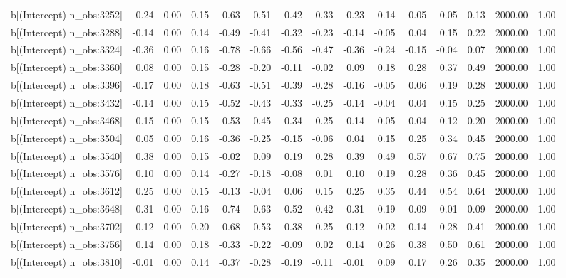 \begin{table}[ht]
\begin{tabular}{rrrrrrrrrrrrrrr}
  b[(Intercept) n\_obs:3252] & -0.24 & 0.00 & 0.15 & -0.63 & -0.51 & -0.42 & -0.33 & -0.23 & -0.14 & -0.05 & 0.05 & 0.13 & 2000.00 & 1.00 \\ 
  b[(Intercept) n\_obs:3288] & -0.14 & 0.00 & 0.14 & -0.49 & -0.41 & -0.32 & -0.23 & -0.14 & -0.05 & 0.04 & 0.15 & 0.22 & 2000.00 & 1.00 \\ 
  b[(Intercept) n\_obs:3324] & -0.36 & 0.00 & 0.16 & -0.78 & -0.66 & -0.56 & -0.47 & -0.36 & -0.24 & -0.15 & -0.04 & 0.07 & 2000.00 & 1.00 \\ 
  b[(Intercept) n\_obs:3360] & 0.08 & 0.00 & 0.15 & -0.28 & -0.20 & -0.11 & -0.02 & 0.09 & 0.18 & 0.28 & 0.37 & 0.49 & 2000.00 & 1.00 \\ 
  b[(Intercept) n\_obs:3396] & -0.17 & 0.00 & 0.18 & -0.63 & -0.51 & -0.39 & -0.28 & -0.16 & -0.05 & 0.06 & 0.19 & 0.28 & 2000.00 & 1.00 \\ 
  b[(Intercept) n\_obs:3432] & -0.14 & 0.00 & 0.15 & -0.52 & -0.43 & -0.33 & -0.25 & -0.14 & -0.04 & 0.04 & 0.15 & 0.25 & 2000.00 & 1.00 \\ 
  b[(Intercept) n\_obs:3468] & -0.15 & 0.00 & 0.15 & -0.53 & -0.45 & -0.34 & -0.25 & -0.14 & -0.05 & 0.04 & 0.12 & 0.20 & 2000.00 & 1.00 \\ 
  b[(Intercept) n\_obs:3504] & 0.05 & 0.00 & 0.16 & -0.36 & -0.25 & -0.15 & -0.06 & 0.04 & 0.15 & 0.25 & 0.34 & 0.45 & 2000.00 & 1.00 \\ 
  b[(Intercept) n\_obs:3540] & 0.38 & 0.00 & 0.15 & -0.02 & 0.09 & 0.19 & 0.28 & 0.39 & 0.49 & 0.57 & 0.67 & 0.75 & 2000.00 & 1.00 \\ 
  b[(Intercept) n\_obs:3576] & 0.10 & 0.00 & 0.14 & -0.27 & -0.18 & -0.08 & 0.01 & 0.10 & 0.19 & 0.28 & 0.36 & 0.45 & 2000.00 & 1.00 \\ 
  b[(Intercept) n\_obs:3612] & 0.25 & 0.00 & 0.15 & -0.13 & -0.04 & 0.06 & 0.15 & 0.25 & 0.35 & 0.44 & 0.54 & 0.64 & 2000.00 & 1.00 \\ 
  b[(Intercept) n\_obs:3648] & -0.31 & 0.00 & 0.16 & -0.74 & -0.63 & -0.52 & -0.42 & -0.31 & -0.19 & -0.09 & 0.01 & 0.09 & 2000.00 & 1.00 \\ 
  b[(Intercept) n\_obs:3702] & -0.12 & 0.00 & 0.20 & -0.68 & -0.53 & -0.38 & -0.25 & -0.12 & 0.02 & 0.14 & 0.28 & 0.41 & 2000.00 & 1.00 \\ 
  b[(Intercept) n\_obs:3756] & 0.14 & 0.00 & 0.18 & -0.33 & -0.22 & -0.09 & 0.02 & 0.14 & 0.26 & 0.38 & 0.50 & 0.61 & 2000.00 & 1.00 \\ 
  b[(Intercept) n\_obs:3810] & -0.01 & 0.00 & 0.14 & -0.37 & -0.28 & -0.19 & -0.11 & -0.01 & 0.09 & 0.17 & 0.26 & 0.35 & 2000.00 & 1.00 \\ 

\end{tabular}
\end{table}
